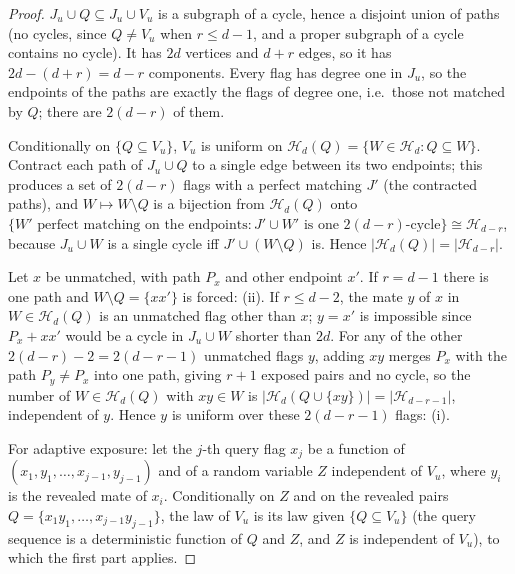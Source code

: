 \documentclass[11pt,a4paper]{article}
\theoremstyle{plain}
\theoremstyle{definition}
\theoremstyle{remark}
\newcommand{\cH}{\mathcal H}
\begin{document}
\label{pf:exposure}
\lemexposure*
\begin{proof}
$J_u\cup Q\subseteq J_u\cup V_u$ is a subgraph of a cycle, hence a disjoint union of paths (no cycles, since $Q\ne V_u$ when $r\le d-1$, and a proper subgraph of a cycle contains no cycle). It has $2d$ vertices and $d+r$ edges, so it has $2d-(d+r)=d-r$ components. Every flag has degree one in $J_u$, so the endpoints of the paths are exactly the flags of degree one, i.e.\ those not matched by $Q$; there are $2(d-r)$ of them.

Conditionally on $\{Q\subseteq V_u\}$, $V_u$ is uniform on $\cH_d(Q)=\{W\in\cH_d:Q\subseteq W\}$. Contract each path of $J_u\cup Q$ to a single edge between its two endpoints; this produces a set of $2(d-r)$ flags with a perfect matching $J'$ (the contracted paths), and $W\mapsto W\setminus Q$ is a bijection from $\cH_d(Q)$ onto $\{W'\text{ perfect matching on the endpoints}:J'\cup W'\text{ is one }2(d-r)\text{-cycle}\}\cong\cH_{d-r}$, because $J_u\cup W$ is a single cycle iff $J'\cup(W\setminus Q)$ is. Hence $|\cH_d(Q)|=|\cH_{d-r}|$.

Let $x$ be unmatched, with path $P_x$ and other endpoint $x'$. If $r=d-1$ there is one path and $W\setminus Q=\{xx'\}$ is forced: (ii). If $r\le d-2$, the mate $y$ of $x$ in $W\in\cH_d(Q)$ is an unmatched flag other than $x$; $y=x'$ is impossible since $P_x+xx'$ would be a cycle in $J_u\cup W$ shorter than $2d$. For any of the other $2(d-r)-2=2(d-r-1)$ unmatched flags $y$, adding $xy$ merges $P_x$ with the path $P_y\ne P_x$ into one path, giving $r+1$ exposed pairs and no cycle, so the number of $W\in\cH_d(Q)$ with $xy\in W$ is $|\cH_d(Q\cup\{xy\})|=|\cH_{d-r-1}|$, independent of $y$. Hence $y$ is uniform over these $2(d-r-1)$ flags: (i).

For adaptive exposure: let the $j$-th query flag $x_j$ be a function of $(x_1,y_1,\dots,x_{j-1},y_{j-1})$ and of a random variable $Z$ independent of $V_u$, where $y_i$ is the revealed mate of $x_i$. Conditionally on $Z$ and on the revealed pairs $Q=\{x_1y_1,\dots,x_{j-1}y_{j-1}\}$, the law of $V_u$ is its law given $\{Q\subseteq V_u\}$ (the query sequence is a deterministic function of $Q$ and $Z$, and $Z$ is independent of $V_u$), to which the first part applies.
\end{proof}
\end{document}

